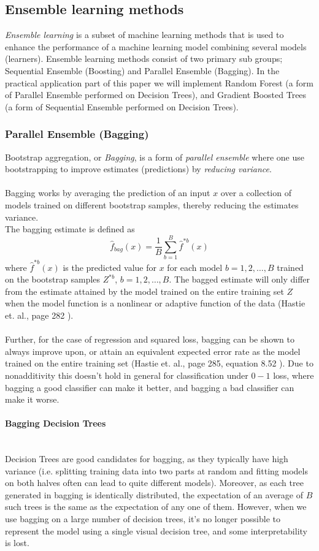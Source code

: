 \documentclass[10pt, a4paper, twocolumn]{article}
\newcommand{\myparagraph}[1]{\paragraph{#1}\mbox{}\\}
\begin{document}
	\subsection{Ensemble learning methods}
		\emph{Ensemble learning} is a subset of machine learning methods that is used to enhance the performance of a machine learning model combining several models (learners). Ensemble learning methods consist of two primary sub groups; Sequential Ensemble (Boosting) and Parallel Ensemble (Bagging). In the practical application part of this paper we will implement Random Forest (a form of Parallel Ensemble performed on Decision Trees), and Gradient Boosted Trees (a form of Sequential Ensemble performed on Decision Trees).		
			\subsubsection{Parallel Ensemble (Bagging)}
				Bootstrap aggregation, or \emph{Bagging}, is a form of \emph{parallel ensemble } where one use bootstrapping to improve estimates (predictions) by \emph{reducing variance}.\\\\	
				Bagging works by averaging the prediction of an input $x$ over a collection of models trained on different bootstrap samples, thereby reducing the estimates variance.\\
				The bagging estimate is defined as 
					$$\hat{f}_{bag}(x)=\frac{1}{B}\sum_{b=1}^B\hat{f}^{*b}(x)$$ 
				where $\hat{f}^{*b}(x)$ is the predicted value for $x$ for each model $b=1,2,\dots,B$ trained on the bootstrap samples $Z^{*b}$, $b=1,2,\dots,B$. The bagged estimate will only differ from the estimate attained by the model trained on the entire training set $Z$ when the model function is a nonlinear or adaptive function of the data (Hastie et. al., page 282 \cite{ElementsOfStatLearning}).\\\\
				Further, for the case of regression and squared loss, bagging can be shown to always improve upon, or attain an equivalent expected error rate as the model trained on the entire training set (Hastie et. al., page 285, equation 8.52 \cite{ElementsOfStatLearning}). Due to nonadditivity this doesn't hold in general for classification under $0-1$ loss, where bagging a good classifier can make it better, and bagging a bad classifier can make it worse. 
				\myparagraph{Bagging Decision Trees}
					Decision Trees are good candidates for bagging, as they typically have high variance (i.e. splitting training data into two parts at random and fitting models on both halves often can lead to quite different models). Moreover, as each tree generated in bagging is identically distributed, the expectation of an average of $B$ such trees is the same as the expectation of any one of them. However, when we use bagging on a large number of decision trees, it's no longer possible to represent the model using a single visual decision tree, and some interpretability is lost.
				
\end{document}
